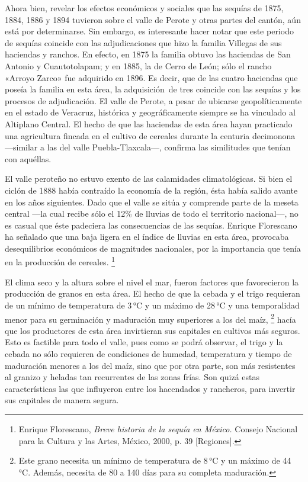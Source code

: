 \documentclass[14pt,twoside,final]{extbook} %
\let\oldfootnote\footnote
\renewcommand\footnote[1]{%
\oldfootnote{\hspace{1mm}#1}}
\begin{document}
Ahora bien, revelar los efectos económicos y sociales que las sequías de 1875, 1884, 1886 y 1894 tuvieron sobre el valle de Perote y otras partes del cantón, aún está por determinarse. Sin embargo, es interesante hacer notar que este periodo de sequías coincide con las adjudicaciones que hizo la familia Villegas de sus haciendas y ranchos. En efecto, en 1875 la familia obtuvo las haciendas de San Antonio y Cuautotolapam; y en 1885, la de Cerro de León; sólo el rancho «Arroyo Zarco» fue adquirido en 1896. Es decir, que de las cuatro haciendas que poseía la familia en esta área, la adquisición~de tres coincide con las sequías y los procesos de adjudicación. El valle de Perote, a pesar de ubicarse geopolíticamente en el estado de Veracruz, histórica y geográficamente siempre se ha vinculado al Altiplano Central. El hecho de que las haciendas de esta área hayan practicado una agricultura fincada en el cultivo de cereales durante la centuria decimonona ---similar a las del valle Puebla-Tlaxcala---, confirma las similitudes que tenían con aquéllas.

El valle peroteño no estuvo exento de las calamidades climatológicas. Si bien el ciclón de 1888 había contraído la economía de la región, ésta había salido avante en los años siguientes. Dado que el valle se sitúa y comprende parte de la meseta central ---la cual recibe sólo el 12\% de lluvias de todo el territorio nacional---, no es casual que éste padeciera las consecuencias de las sequías. Enrique Florescano ha señalado que una baja ligera en el índice de lluvias en esta área, provocaba desequilibrios económicos de magnitudes nacionales, por la importancia que tenía en la producción de cereales.\footnote{Enrique Florescano, \emph{Breve historia de la sequía en México.} Consejo Nacional para la Cultura y las Artes, México, 2000, p. 39 [Regiones].}

El clima seco y la altura sobre el nivel el mar, fueron factores que favorecieron la producción de granos en esta área. El hecho de que la cebada y el trigo requieran de un mínimo de temperatura de 3\,°C y un máximo de 28\,°C y una temporalidad menor para su germinación y maduración muy superiores a los del maíz,\footnote{Este grano necesita un mínimo de temperatura de 8\,°C y un máximo de 44\,°C. Además, necesita de 80 a 140 días para su completa maduración.} hacía que los productores de esta área invirtieran sus capitales en cultivos más seguros. Esto es factible para todo el valle, pues como se podrá observar, el trigo y la cebada no sólo requieren de condiciones de humedad, temperatura y tiempo de maduración menores a los del maíz, sino que por otra parte, son más resistentes al granizo y heladas tan recurrentes de las zonas frías. Son quizá estas características las que influyeron entre los hacendados y rancheros, para invertir sus capitales de manera segura.
\end{document}
